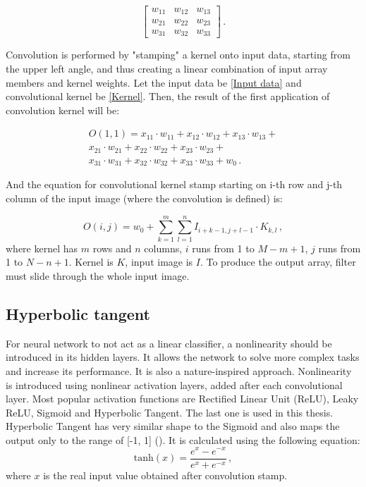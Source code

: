 \begin{equation}
	\begin{bmatrix}
    w_{11}       & w_{12} & w_{13} \\
    w_{21}       & w_{22} & w_{23} \\
    w_{31}       & w_{32} & w_{33} 
	\end{bmatrix}\,.
\label{Kernel}
\end{equation}

Convolution is performed by "stamping" a kernel onto input data, starting from the upper left angle, and thus creating a linear combination of input array members and kernel weights. Let the input data be \eqref{Input data} and convolutional kernel be \eqref{Kernel}. Then, the result of the first application of convolution kernel will be:

\begin{equation}
\begin{aligned}
	O(1, 1) = x_{11}\cdot w_{11} + x_{12}\cdot w_{12} + x_{13}\cdot w_{13} +\\
	x_{21}\cdot w_{21} + x_{22}\cdot w_{22} + x_{23}\cdot w_{23} + \\
	x_{31}\cdot w_{31} + x_{32}\cdot w_{32} + x_{33}\cdot w_{33} + w_0\,.
\end{aligned}
\end{equation}

And the equation for convolutional kernel stamp starting on i-th row and j-th column of the input image (where the convolution is defined) is:

\begin{equation}
	O(i, j) = w_0 + \sum\limits_{k=1}^m \sum\limits_{l=1}^n I_{i+k-1, j+l-1}\cdot K_{k, l} \,,
\end{equation}
where kernel has $m$ rows and $n$ columns, $i$ runs from 1 to $M-m+1$, $j$ runs from 1 to $N-n+1$. Kernel is $K$, input image is $I$. To produce the output array, filter must slide through the whole input image.


\subsection{Hyperbolic tangent}

For neural network to not act as a linear classifier, a nonlinearity should be introduced in its hidden layers. It allows the network to solve more complex tasks and increase its performance. It is also a nature-inspired approach. Nonlinearity is introduced using nonlinear activation layers, added after each convolutional layer. Most popular activation functions are Rectified Linear Unit (ReLU), Leaky ReLU, Sigmoid and Hyperbolic Tangent. The last one is used in this thesis. Hyperbolic Tangent has very similar shape to the Sigmoid and also maps the output only to the range of [-1, 1] (). It is calculated using the following equation:
\begin{equation}
	\textrm{tanh}(x) = \frac{e^x-e^{-x}}{e^x+e^{-x}}\,,
\end{equation}
where $x$ is the real input value obtained after convolution stamp.

